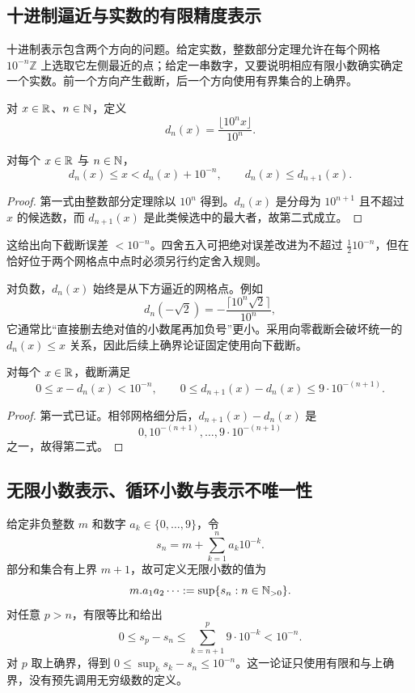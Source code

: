 \subsection{十进制逼近与实数的有限精度表示}

十进制表示包含两个方向的问题。给定实数，整数部分定理允许在每个网格 \(10^{-n}\mathbb Z\) 上选取它左侧最近的点；给定一串数字，又要说明相应有限小数确实确定一个实数。前一个方向产生截断，后一个方向使用有界集合的上确界。

对 \(x\in\mathbb{R}\)、\(n\in\mathbb{N}\)，定义
\[
 d_n(x)=\frac{\lfloor10^n x\rfloor}{10^n}.
\]

\begin{proposition}
对每个 \(x\in\mathbb{R}\) 与 \(n\in\mathbb{N}\)，
\[
 d_n(x)\le x<d_n(x)+10^{-n},
\qquad d_n(x)\le d_{n+1}(x).
\]
\end{proposition}

\begin{proof}
第一式由整数部分定理除以 \(10^n\) 得到。\(d_n(x)\) 是分母为 \(10^{n+1}\) 且不超过 \(x\) 的候选数，而 \(d_{n+1}(x)\) 是此类候选中的最大者，故第二式成立。
\end{proof}

这给出向下截断误差 \(<10^{-n}\)。四舍五入可把绝对误差改进为不超过 \(\frac12 10^{-n}\)，但在恰好位于两个网格点中点时必须另行约定舍入规则。

对负数，\(d_n(x)\) 始终是从下方逼近的网格点。例如
\[
 d_n(-\sqrt2)=-\frac{\lceil10^n\sqrt2\rceil}{10^n},
\]
它通常比“直接删去绝对值的小数尾再加负号”更小。采用向零截断会破坏统一的 \(d_n(x)\le x\) 关系，因此后续上确界论证固定使用向下截断。

\begin{proposition}
对每个 \(x\in\mathbb{R}\)，截断满足
\[
 0\le x-d_n(x)<10^{-n},\qquad
 0\le d_{n+1}(x)-d_n(x)\le9\cdot10^{-(n+1)}.
\]
\end{proposition}

\begin{proof}
第一式已证。相邻网格细分后，\(d_{n+1}(x)-d_n(x)\) 是
\[
 0,10^{-(n+1)},\ldots,9\cdot10^{-(n+1)}
\]
之一，故得第二式。
\end{proof}

\subsection{无限小数表示、循环小数与表示不唯一性}


给定非负整数 \(m\) 和数字 \(a_k\in\{0,\ldots,9\}\)，令
\[
 s_n=m+\sum_{k=1}^n a_k10^{-k}.
\]
部分和集合有上界 \(m+1\)，故可定义无限小数的值为
\[
 m.a_1a_2\cdots:=\sup\{s_n:n\in\mathbb{N}_{>0}\}.
\]
对任意 \(p>n\)，有限等比和给出
\[
 0\le s_p-s_n
 \le \sum_{k=n+1}^{p}9\cdot10^{-k}
 <10^{-n}.
\]
对 \(p\) 取上确界，得到 \(0\le \sup_k s_k-s_n\le10^{-n}\)。这一论证只使用有限和与上确界，没有预先调用无穷级数的定义。

